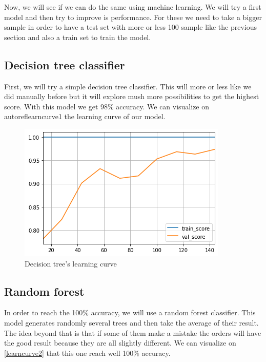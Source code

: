 \documentclass[]{article}
\begin{document}
Now, we will see if we can do the same using machine learning. We will try a first model and then
try to improve is performance. For these we need to take a bigger sample in order to have a test set
with more or less 100 sample like the previous section and also a train set to train the model.

\subsection{Decision tree classifier}

First, we will try a simple decision tree classifier. This will more or less like we did manually before
but it will explore mush more possibilities to get the highest score. With this model we get 98\% accuracy.
We can visualize on autoref{learncurve1} the learning curve of our model.


\begin{figure}[H]
    \centering
    \caption{\label{learncurve1}Decision tree's learning curve}
    \includegraphics[scale=0.5]{images/learncurve1.png}
\end{figure}

\subsection{Random forest}

In order to reach the 100\% accuracy, we will use a random forest classifier. This model
generates randomly several trees and then take the average of their result. The idea beyond
that is that if some of them make a mistake the orders will have the good result because they
are all slightly different. We can visualize on \autoref{learncurve2} that this one reach 
well 100\% accuracy.
\end{document}
